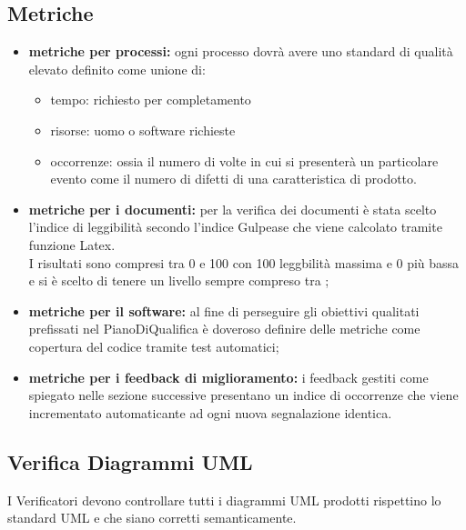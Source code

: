 \documentclass[NormeDiProgetto.tex]{subfiles}
\begin{document}
	\subsection{Metriche}
	\begin{itemize}
		\item \textbf{metriche per processi:} ogni processo dovrà avere uno standard di qualità elevato definito come unione di:
		\begin{itemize}
			\item tempo: richiesto per completamento
			\item risorse: uomo o software richieste
			\item occorrenze: ossia il numero di volte in cui si presenterà un particolare evento come il numero di difetti di una caratteristica di prodotto. 
		\end{itemize} 
		
		\item \textbf{metriche per i documenti:} per la verifica dei documenti è stata scelto l'indice di leggibilità secondo l'indice Gulpease che viene calcolato tramite funzione Latex.\\I risultati sono compresi tra 0 e 100 con 100 leggbilità massima e 0 più bassa e si è scelto di tenere un livello sempre compreso tra ;%
		 
		\item \textbf{metriche per il software:} al fine di perseguire gli obiettivi qualitati prefissati nel PianoDiQualifica è doveroso definire delle metriche come copertura del codice tramite test automatici; %
		\item \textbf{metriche per i feedback di miglioramento:} i feedback gestiti come spiegato nelle sezione successive presentano un indice di occorrenze che viene incrementato automaticante ad ogni nuova segnalazione identica. 
	\end{itemize}
	
	\subsection{Verifica Diagrammi UML}
	I Verificatori devono controllare tutti i diagrammi UML prodotti rispettino lo standard UML e che siano corretti semanticamente.
	
	
\end{document}
